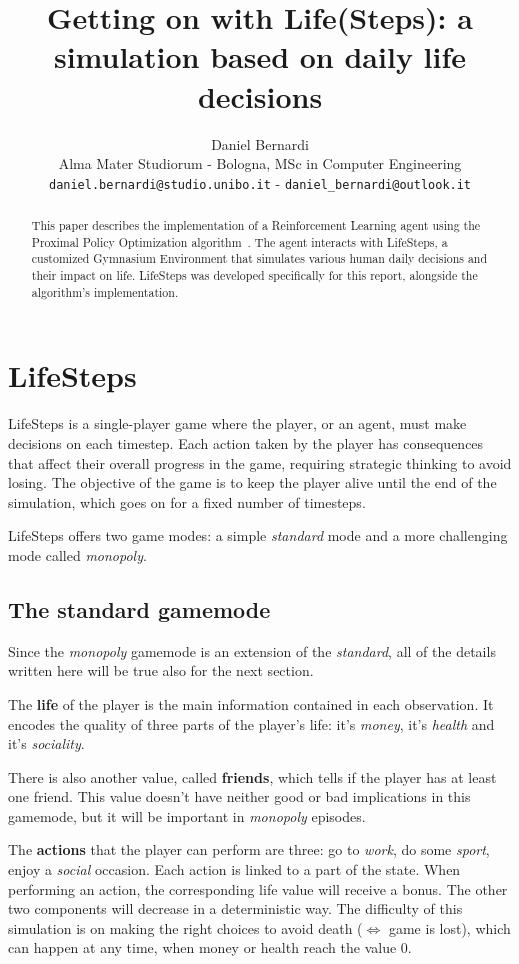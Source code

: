 \documentclass{article}
\title{Getting on with Life(Steps): a simulation based on daily life decisions}
\author{%
  Daniel Bernardi\\
  Alma Mater Studiorum - Bologna, MSc in Computer Engineering\\
  \texttt{daniel.bernardi@studio.unibo.it} - \texttt{daniel\_bernardi@outlook.it}
}
\begin{document}
\maketitle

\begin{abstract}
This paper describes the implementation of a Reinforcement Learning agent using the Proximal Policy Optimization algorithm~\citep{DBLP:journals/corr/SchulmanWDRK17}. The agent interacts with LifeSteps, a customized Gymnasium Environment that simulates various human daily decisions and their impact on life. LifeSteps was developed specifically for this report, alongside the algorithm's implementation.
\end{abstract}


\section{LifeSteps}
LifeSteps is a single-player game where the player, or an agent, must make decisions on each timestep. Each action taken by the player has consequences that affect their overall progress in the game, requiring strategic thinking to avoid losing. The objective of the game is to keep the player alive until the end of the simulation, which goes on for a fixed number of timesteps. 

LifeSteps offers two game modes: a simple \textit{standard} mode and a more challenging mode called \textit{monopoly}.

\subsection{The standard gamemode}
Since the \textit{monopoly} gamemode is an extension of the \textit{standard}, all of the details written here will be true also for the next section.

The \textbf{life} of the player is the main information contained in each observation. It encodes the quality of three parts of the player's life: it's \textit{money}, it's \textit{health} and it's \textit{sociality}.

There is also another value, called \textbf{friends}, which tells if the player has at least one friend. This value doesn't have neither good or bad implications in this gamemode, but it will be important in \textit{monopoly} episodes. 

The \textbf{actions} that the player can perform are three: go to \textit{work}, do some \textit{sport}, enjoy a \textit{social} occasion. 
Each action is linked to a part of the state. When performing an action, the corresponding life value will receive a bonus. The other two components will decrease in a deterministic way. 
The difficulty of this simulation is on making the right choices to avoid death (\(\Leftrightarrow\) game is lost), which can happen at any time, when money or health reach the value 0. 
\end{document}
